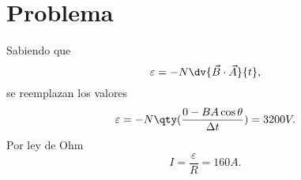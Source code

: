 \section*{Problema}

Sabiendo que
	$$ \varepsilon = -N \dv{\vec{B} \cdot \vec{A}}{t}, $$
se reemplazan los valores
	$$ \varepsilon = -N \qty(\frac{0 - BA\cos{\theta}}{\Delta t}) = 3200V. $$
Por ley de Ohm
	$$ \boxed{I = \frac{\varepsilon}{R} = 160A.} $$






